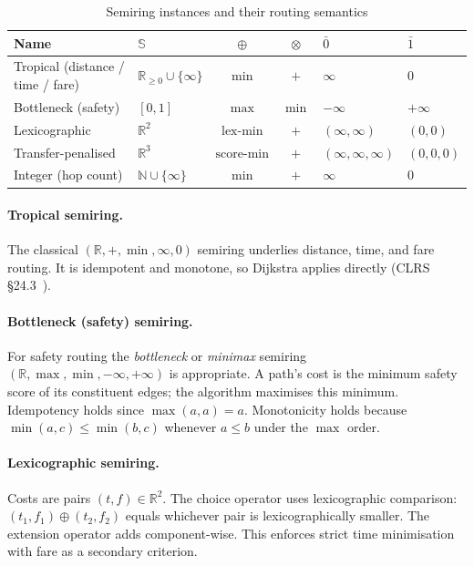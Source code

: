 \documentclass[12pt,a4paper]{article}
\newcommand{\opl}{\oplus}
\newcommand{\R}{\mathbb{R}}
\begin{document}
\begin{table}[H]
\centering
\caption{Semiring instances and their routing semantics}
\label{tab:semiring-instances}
\renewcommand{\arraystretch}{1.3}
\begin{tabular}{l l c c l l}
\toprule
\textbf{Name} & $\mathbb{S}$ & $\oplus$ & $\otimes$ & $\bar{0}$ & $\bar{1}$ \\
\midrule
Tropical (distance / time / fare)
  & $\mathbb{R}_{\geq 0} \cup \{\infty\}$
  & $\min$ & $+$
  & $\infty$ & $0$ \\

Bottleneck (safety)
  & $[0,1]$
  & $\max$ & $\min$
  & $-\infty$ & $+\infty$ \\

Lexicographic
  & $\mathbb{R}^{2}$
  & $\mathrm{lex\text{-}min}$ & $+$
  & $(\infty,\infty)$ & $(0,0)$ \\

Transfer-penalised
  & $\mathbb{R}^{3}$
  & $\mathrm{score\text{-}min}$ & $+$
  & $(\infty,\infty,\infty)$ & $(0,0,0)$ \\

Integer (hop count)
  & $\mathbb{N} \cup \{\infty\}$
  & $\min$ & $+$
  & $\infty$ & $0$ \\
\bottomrule
\end{tabular}
\end{table}

\paragraph{Tropical semiring.}
The classical $(\R, +, \min, \infty, 0)$ semiring underlies distance, time,
and fare routing.  It is idempotent and monotone, so Dijkstra applies
directly (CLRS §24.3~\cite{clrs}).

\paragraph{Bottleneck (safety) semiring.}
For safety routing the \emph{bottleneck} or \emph{minimax} semiring
$(\R, \max, \min, -\infty, +\infty)$ is appropriate.  A path's cost is the
minimum safety score of its constituent edges; the algorithm maximises this
minimum.  Idempotency holds since $\max(a,a) = a$.  Monotonicity holds
because $\min(a, c) \leq \min(b, c)$ whenever $a \leq b$ under the $\max$
order.

\paragraph{Lexicographic semiring.}
Costs are pairs $(t, f) \in \R^2$.  The choice operator uses
lexicographic comparison: $(t_1, f_1) \opl (t_2, f_2)$ equals whichever
pair is lexicographically smaller.  The extension operator adds
component-wise.  This enforces strict time minimisation with fare as a
secondary criterion.
\end{document}
